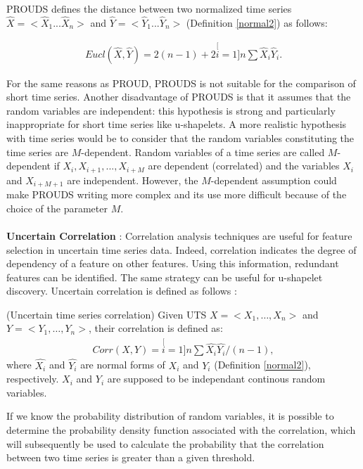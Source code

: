 PROUDS defines the distance between two normalized time series  $\hat{X}=<\hat{X}_{1}...\hat{X}_{n}>$ and $\hat{Y}=<\hat{Y}_{1}...\hat{Y}_{n}>$ (Definition \ref{normal2}) as follows:

\begin{eqnarray}
Eucl(\hat{X},\hat{Y})=2(n-1)+2\stackrel[i=1]{n}{\sum}\hat{X}_{i}\hat{Y}_{i}.
\end{eqnarray}

For the same reasons as PROUD, PROUDS is not suitable for the comparison of short time series. Another disadvantage of PROUDS is that it assumes that the random variables  are independent: this hypothesis is strong and particularly inappropriate for short time series like u-shapelets. A more realistic hypothesis with time series would be to consider that the random variables constituting the time series are $M$-dependent. Random variables of a time series are called $M$-dependent
 if $X_{i},X_{i+1},...,X_{i+M}$ are dependent (correlated) and the
variables $X_{i}$ and $X_{i+M+1}$ are independent. However, the $M$-dependent assumption could make PROUDS writing more complex and its use more difficult because of the choice of the parameter $M$. 

\paragraph{}\textbf{Uncertain Correlation} \cite{Orang2017}: 
Correlation analysis techniques are useful for feature selection in uncertain time series data. Indeed, correlation indicates the degree of dependency of a feature on other features. Using this information, redundant features can be identified. The same strategy can be useful for  u-shapelet discovery.  Uncertain
correlation is defined as follows : 


\begin{definition}
(Uncertain time series correlation) Given UTS  $X = <X_1, \ldots, X_n>$ and  $Y = <Y_1, \ldots, Y_n>$, their correlation is defined as:
\begin{eqnarray}
Corr(X,Y)=\stackrel[i=1]{n}{\sum}\hat{X_{i}}\hat{Y_{i}}/(n-1),
\end{eqnarray}
where $\hat{X_{i}}$ and
$\hat{Y_{i}}$ are normal forms of $X_i$ and $Y_i$ (Definition \ref{normal2}), respectively. $X_i$ and $Y_i$ are supposed to be independant continous random variables.
\end{definition}
If we know the probability distribution of random variables, it is possible to determine the probability density function associated with the correlation, which will subsequently be used to calculate the probability that the correlation between two time series is greater than a given threshold.   


